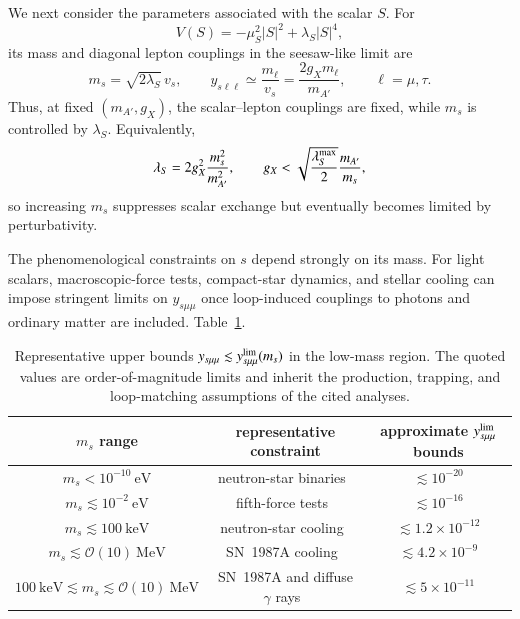 \documentclass[onecolumn, aps, nofootinbib, prd, preprint, floats, floatfix, amsmath, amssymb, superscriptaddress, preprintnumbers]{revtex4-2}
\begin{document}
We next consider the parameters associated with the scalar $S$. For
\begin{equation}
V(S)=-\mu_S^2|S|^2+\lambda_S|S|^4,
\end{equation}
its mass and diagonal lepton couplings in the seesaw-like limit are
\begin{equation}
m_s=\sqrt{2\lambda_S}\,v_s,
\qquad
y_{s\ell\ell}\simeq\frac{m_\ell}{v_s}
=\frac{2g_Xm_\ell}{m_{A'}},
\qquad \ell=\mu,\tau.
\label{y-and-gX}
\end{equation}
Thus, at fixed $(m_{A'},g_X)$, the scalar--lepton couplings are fixed, while $m_s$ is controlled by $\lambda_S$. Equivalently,
\begin{equation}
\lambda_S=2g_X^2\frac{m_s^2}{m_{A'}^2},
\qquad
g_X<\sqrt{\frac{\lambda_S^{\rm max}}{2}}\frac{m_{A'}}{m_s},
\label{eq:scalar-perturbativity-bound}
\end{equation}
so increasing $m_s$ suppresses scalar exchange but eventually becomes limited by perturbativity.

The phenomenological constraints on $s$ depend strongly on its mass. For light scalars, macroscopic-force tests, compact-star dynamics, and stellar cooling can impose stringent limits on $y_{s\mu\mu}$ once loop-induced couplings to photons and ordinary matter are included. Table~\ref{tab:scalar_constraints}.

\begin{table}[htbp]
\centering
\begin{tabular}{ccc}
\hline
$m_s$ range & representative constraint & approximate $y_{s\mu\mu}^{\rm lim}$ bounds \\
\hline
$m_s<10^{-10}~\mathrm{eV}$ & neutron-star binaries~\cite{Dror:2019uea,Liu:2025zuz} & $\lesssim10^{-20}$ \\
$m_s\lesssim10^{-2}~\mathrm{eV}$ & fifth-force tests~\cite{Hoskins:1985tn,Kapner:2006si,Blakemore:2021zna} & $\lesssim10^{-16}$ \\
$m_s\lesssim100~\mathrm{keV}$ & neutron-star cooling~\cite{Fiorillo:2026wso} & $\lesssim1.2\times10^{-12}$ \\
$m_s\lesssim\mathcal O(10)~\mathrm{MeV}$ & SN~1987A cooling~\cite{Caputo:2021rux,Balazs:2022tjl} & $\lesssim4.2\times10^{-9}$ \\
$100~\mathrm{keV}\lesssim m_s\lesssim\mathcal O(10)~\mathrm{MeV}$ & SN~1987A and diffuse $\gamma$ rays~\cite{Caputo:2021rux,Balazs:2022tjl} & $\lesssim5\times10^{-11}$ \\
\hline
\end{tabular}
\caption{Representative upper bounds $y_{s\mu\mu}\lesssim y_{s\mu\mu}^{\rm lim}(m_s)$ in the low-mass region. The quoted values are order-of-magnitude limits and inherit the production, trapping, and loop-matching assumptions of the cited analyses.}
\label{tab:scalar_constraints}
\end{table}
\end{document}
